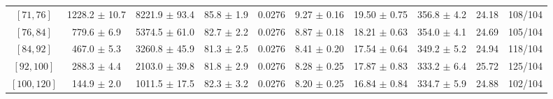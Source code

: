 \begin{tabular}{c||c|c|c|c|c|c|c||c|c}
$[71, 76]$ & 1228.2 $\pm$ 10.7 & 8221.9 $\pm$ 93.4 & 85.8 $\pm$ 1.9 & 0.0276 & 9.27 $\pm$ 0.16 & 19.50 $\pm$ 0.75 & 356.8 $\pm$ 4.2 & 24.18 & 108/104\\
$[76, 84]$ & 779.6 $\pm$ 6.9 & 5374.5 $\pm$ 61.0 & 82.7 $\pm$ 2.2 & 0.0276 & 8.87 $\pm$ 0.18 & 18.21 $\pm$ 0.63 & 354.0 $\pm$ 4.1 & 24.69 & 105/104\\
$[84, 92]$ & 467.0 $\pm$ 5.3 & 3260.8 $\pm$ 45.9 & 81.3 $\pm$ 2.5 & 0.0276 & 8.41 $\pm$ 0.20 & 17.54 $\pm$ 0.64 & 349.2 $\pm$ 5.2 & 24.94 & 118/104\\
$[92, 100]$ & 288.3 $\pm$ 4.4 & 2103.0 $\pm$ 39.8 & 81.8 $\pm$ 2.9 & 0.0276 & 8.28 $\pm$ 0.25 & 17.87 $\pm$ 0.83 & 333.2 $\pm$ 6.4 & 25.72 & 125/104\\
$[100, 120]$ & 144.9 $\pm$ 2.0 & 1011.5 $\pm$ 17.5 & 82.3 $\pm$ 3.2 & 0.0276 & 8.20 $\pm$ 0.25 & 16.84 $\pm$ 0.84 & 334.7 $\pm$ 5.9 & 24.88 & 102/104\\
\end{tabular}
